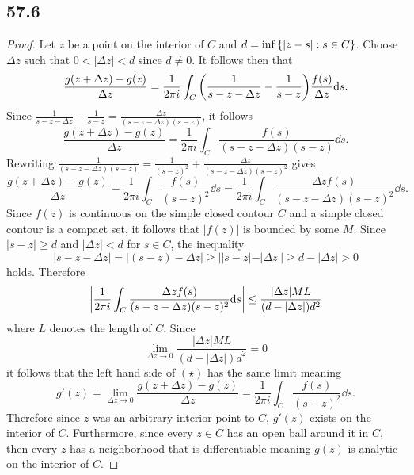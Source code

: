 \documentclass[12pt,titlepage]{extarticle}
\begin{document}
\subsection*{57.6}
\begin{proof}
    Let $z$ be a point on the interior of $C$ and $d = \inf\qty{|z - s| : s \in C}$. Choose $\Delta z$ such that $0 < |\Delta z| < d$ since $d \neq 0$. It follows then that
    \[
        \frac{g(z + \Delta z) - g(z)}{\Delta z} = \frac{1}{2 \pi i} \int_C \qty(\frac{1}{s - z - \Delta z} - \frac{1}{s - z}) \frac{f(s)}{\Delta z} \dd s
    .\]
    Since $\frac{1}{s - z - \Delta z} - \frac{1}{s - z} = \frac{\Delta z}{(s - z - \Delta z)(s -z)}$, it follows
    \[
        \frac{g(z + \Delta z) - g(z)}{\Delta z} = \frac{1}{2 \pi i} \int_C \frac{f(s)}{(s - z - \Delta z)(s -z)} \dd s
    .\]
    Rewriting $\frac{1}{(s - z - \Delta z)(s - z)} = \frac{1}{(s-z)^2} + \frac{\Delta z}{(s - z - \Delta z)(s-z)^2}$ gives
    \[
        \frac{g(z + \Delta z) - g(z)}{\Delta z} - \frac{1}{2 \pi i} \int_C \frac{f(s)}{(s-z)^2} \dd s = \frac{1}{2 \pi i} \int_C \frac{\Delta z f(s)}{(s - z - \Delta z)(s - z)^2} \dd s
    . \tag{$\star$}\]
    Since $f(z)$ is continuous on the simple closed contour $C$ and a simple closed contour is a compact set, it follows that $|f(z)|$ is bounded by some $M$. Since $|s - z| \geq d$ and $|\Delta z| < d$ for $s \in C$, the inequality
    \[
        |s - z - \Delta z| = |(s-z) - \Delta z| \geq ||s-z| - |\Delta z|| \geq d - |\Delta z| > 0
    \]
    holds. Therefore
    \[
        \qty|\frac{1}{2 \pi i} \int_C \frac{\Delta z f(s)}{(s - z - \Delta z)(s - z)^2} \dd s| \leq \frac{|\Delta z| M L}{(d - |\Delta z|)d^2}
    \]
    where $L$ denotes the length of $C$. Since
    \[
        \lim_{\Delta z \to 0} \frac{|\Delta z| M L}{(d - |\Delta z|)d^2} = 0
    \]
    it follows that the left hand side of $(\star)$ has the same limit meaning
    \[
        g'(z) = \lim_{\Delta z \to 0} \frac{g(z + \Delta z) - g(z)}{\Delta z} = \frac{1}{2 \pi i} \int_C \frac{f(s)}{(s - z)^2} \dd s
    .\]
    Therefore since $z$ was an arbitrary interior point to $C$, $g'(z)$ exists on the interior of $C$. Furthermore, since every $z \in C$ has an open ball around it in $C$, then every $z$ has a neighborhood that is differentiable meaning $g(z)$ is analytic on the interior of $C$.
\end{proof}
\end{document}
